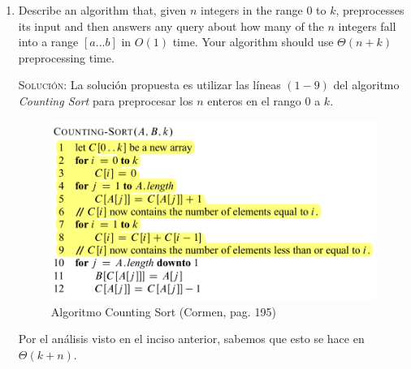 \documentclass[letterpaper,11pt]{article}
\begin{document}
\begin{enumerate}
\begin{proof}
        Cuando $m$ es $O(n^2)$, también es posible ordenarlo en $O(n)$. Para 
        ello, utilizaremos una variación de \texttt{Radix Sort}, el cual 
        también hemos discutido en clase. La idea de \texttt{Radix} es ordenar
        dígito por dígito, empezando por el dígito menos significativo y 
        pasando al más significativo. Aquí, \texttt{Counting Sort} se usa como 
        una subrutina para ordenar. Para usar este algoritmo debe haber $d$ 
        digitos en los enteros de entrada. Usualmente, \texttt{Radix Sort} toma 
        $O(d \cdot (n + k))$, donde $k$ es la base para representar números 
        (por ejemplo, la base decimal). Como $m = O(n^2)$, entonces ese es su 
        mayor valor posible, por lo que $d = O(\log_k n)$. Así, la complejidad 
        sería $O((\log_k n) \cdot (n + k))$. Para hacer esto lineal, el truco 
        está en cambiar la base $k$. Si reemplazamos a $k$ con $n$, entonces 
        el valor de $O(\log_k n)$ se convierte en $O(1)$, y la complejidad se 
        convierte en $O(n)$. 

    \end{proof}

    \item Describe an algorithm that, given $n$ integers in the range $0$ to 
    $k$, preprocesses its input and then answers any query about how many of 
    the $n$ integers fall into a range $[a ... b]$ in $O(1)$ time. Your 
    algorithm should use $\Theta(n + k)$ preprocessing time.

    \textsc{Solución:} La solución propuesta es utilizar las líneas $(1 - 9)$
    del algoritmo \textit{Counting Sort} para preprocesar los $n$ enteros en 
    el rango $0$ a $k$.

    \begin{figure}[h]
        \centering
        \includegraphics[width=0.5\linewidth]{imagenes/counting-sort.png}
        \caption{Algoritmo Counting Sort (Cormen, pag. 195)}
        \label{fig:counting-sort}
    \end{figure}

    Por el análisis visto en el inciso anterior, sabemos que esto se hace en 
    $\Theta(k + n)$. 


\end{enumerate}
\end{document}
